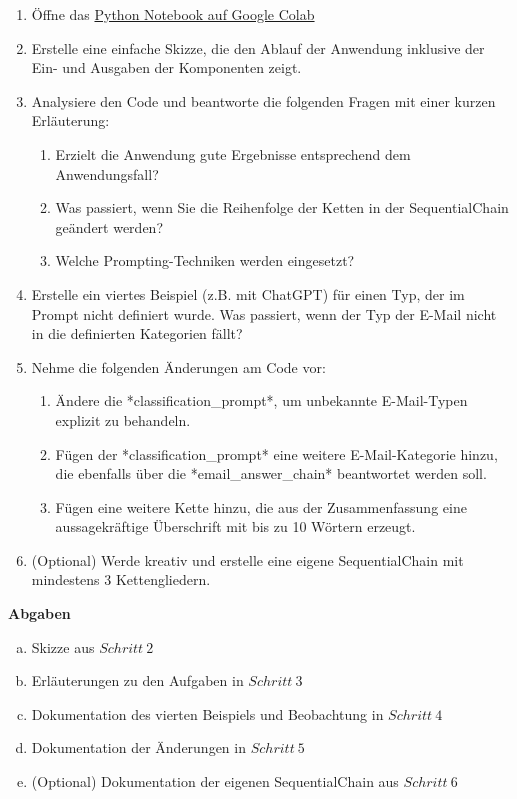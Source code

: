 \documentclass[12pt,ngerman]{AssignmentClass}
\begin{document}
        
\begin{enumerate}
\item Öffne das \href{https://colab.research.google.com/drive/1UCRWkXX_R3sopfzp_KzXBdkdrzukWwzE\#scrollTo=_x418HsXt1q-}{Python Notebook auf Google Colab} 
\item Erstelle eine einfache Skizze, die den Ablauf der Anwendung inklusive der Ein- und Ausgaben der Komponenten zeigt.
\item Analysiere den Code und beantworte die folgenden Fragen mit einer kurzen Erläuterung:
\begin{enumerate}
    \item Erzielt die Anwendung gute Ergebnisse entsprechend dem Anwendungsfall?
    \item Was passiert, wenn Sie die Reihenfolge der Ketten in der SequentialChain geändert werden?
    \item Welche Prompting-Techniken werden eingesetzt? 
\end{enumerate}
\item  Erstelle ein viertes Beispiel (z.B. mit ChatGPT) für einen Typ, der im Prompt nicht definiert wurde. Was passiert, wenn der Typ der E-Mail nicht in die definierten Kategorien fällt?
\item  Nehme die folgenden Änderungen am Code vor:
\begin{enumerate}
    \item Ändere die *classification\_prompt*, um unbekannte E-Mail-Typen explizit zu behandeln.
    \item Fügen der *classification\_prompt* eine weitere E-Mail-Kategorie hinzu, die ebenfalls über die *email\_answer\_chain* beantwortet werden soll.
    \item Fügen eine weitere Kette hinzu, die aus der Zusammenfassung eine aussagekräftige Überschrift mit bis zu 10 Wörtern erzeugt.
\end{enumerate}
\item (Optional) Werde kreativ und erstelle eine eigene SequentialChain mit mindestens 3 Kettengliedern.
\end{enumerate}

\textbf{Abgaben}
\begin{enumerate}[a)]
\item Skizze aus $Schritt\ 2$ 								
\item Erläuterungen zu den Aufgaben in $Schritt\ 3$
\item Dokumentation des vierten Beispiels und Beobachtung in $Schritt\ 4$
\item  Dokumentation der Änderungen in $Schritt\ 5$
\item (Optional) Dokumentation der eigenen SequentialChain aus $Schritt\ 6$
\end{enumerate}
\end{document}
